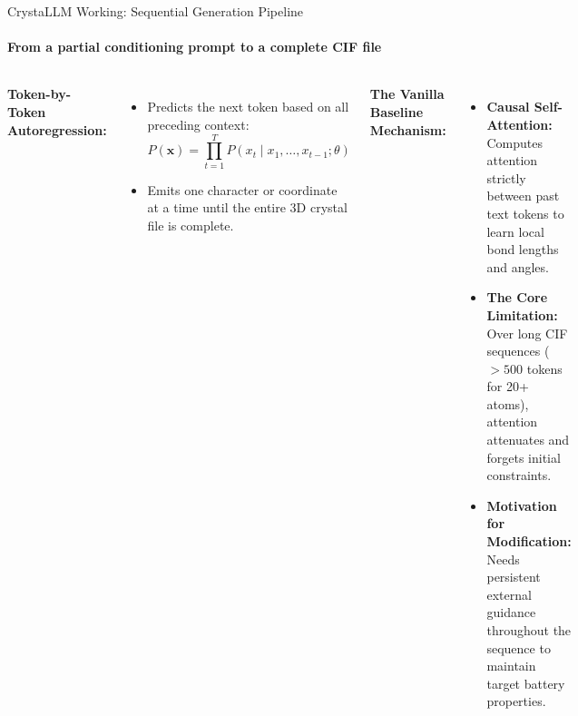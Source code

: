 \documentclass[aspectratio=169, 11pt]{beamer}
\begin{document}
\begin{frame}{CrystaLLM Working: Sequential Generation Pipeline~\cite{antunes2024crystallm}}
\framesubtitle{From a partial conditioning prompt to a complete CIF file}

\vspace{0.25cm}
\centering
{}

\vspace{0.35cm}
\begin{columns}[T]
    \footnotesize
    \textbf{Token-by-Token Autoregression:}
    \vspace{0.15cm}
    \begin{itemize}\itemsep0.8em
        \item Predicts the next token based on all preceding context:
        $$P(\mathbf{x}) = \prod_{t=1}^{T} P(x_t \mid x_1, \dots, x_{t-1}; \theta)$$
        \item Emits one character or coordinate at a time until the entire 3D crystal file is complete.
    \end{itemize}

    \footnotesize
    \textbf{The Vanilla Baseline Mechanism:}
    \vspace{0.15cm}
    \begin{itemize}\itemsep0.5em
        \item \textbf{Causal Self-Attention:} Computes attention strictly between past text tokens to learn local bond lengths and angles.
        \item \textbf{The Core Limitation:} Over long CIF sequences ($> 500$ tokens for 20+ atoms), attention attenuates and forgets initial constraints.
        \item \textbf{Motivation for Modification:} Needs persistent external guidance throughout the sequence to maintain target battery properties.
    \end{itemize}
\end{columns}
\end{frame}
\end{document}
